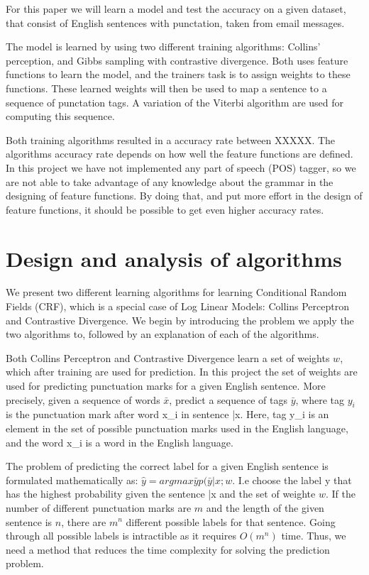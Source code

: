 \documentclass[12pt]{article}
\begin{document}
For this paper we will learn a model and test the accuracy on a given dataset, that consist of English sentences with punctation, taken from email messages.

The model is learned by using two different training algorithms: Collins' perception, and Gibbs sampling with contrastive divergence. Both uses feature functions to learn the model, and the trainers task is to assign weights to these functions. These learned weights will then be used to map a sentence to a sequence of punctation tags. A variation of the Viterbi algorithm are used for computing this sequence. 

Both training algorithms resulted in a accuracy rate between XXXXX. The algorithms accuracy rate depends on how well the feature functions are defined. In this project we have not implemented any part of speech (POS) tagger, so we are not able to take advantage of any knowledge about the grammar in the designing of feature functions. By doing that, and put more effort in the design of feature functions, it should be possible to get even higher accuracy rates.




\section*{Design and analysis of algorithms}
We present two different learning algorithms for learning Conditional Random Fields (CRF), which is a special case of Log Linear Models: Collins Perceptron and Contrastive Divergence. We begin by introducing the problem we apply the two algorithms to, followed by an explanation of each of the algorithms.

Both Collins Perceptron and Contrastive Divergence learn a set of weights $w$, which after training are used for prediction. In this project the set of weights are used for predicting punctuation marks for a given English sentence. More precisely, given a sequence of words $\bar x$, predict a sequence of tags $\bar y$, where tag $y_i$ is the punctuation mark after word x_i in sentence \bar x. Here, tag y_i is an element in the set of possible punctuation marks used in the English language, and the word x_i is a word in the English language. 

The problem of predicting the correct label for a given English sentence is formulated mathematically as: $\hat y = argmax \bar y p(\bar y | x; w$. I.e choose the label \hat y that has the highest probability given the sentence \bar x and the set of weighte $w$. If the number of different punctuation marks are $m$ and the length of the given sentence is $n$, there are $m^n$ different possible labels for that sentence. Going through all possible labels is intractible as it requires $O(m^n)$ time. Thus, we need a method that reduces the time complexity for solving the prediction problem.
\end{document}
